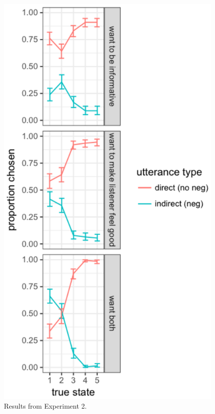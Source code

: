 \documentclass[10pt, letterpaper]{article}
\newenvironment{CodeChunk}{}{}
\begin{document}
\begin{CodeChunk}
\captionsetup{width=0.8\textwidth}\begin{figure}[t]

{\centering \includegraphics{figs/expt2_results2-1} 

}

\caption[Results from Experiment 2]{Results from Experiment 2.}\label{fig:expt2_results2}
\end{figure}
\end{CodeChunk}
\end{document}
